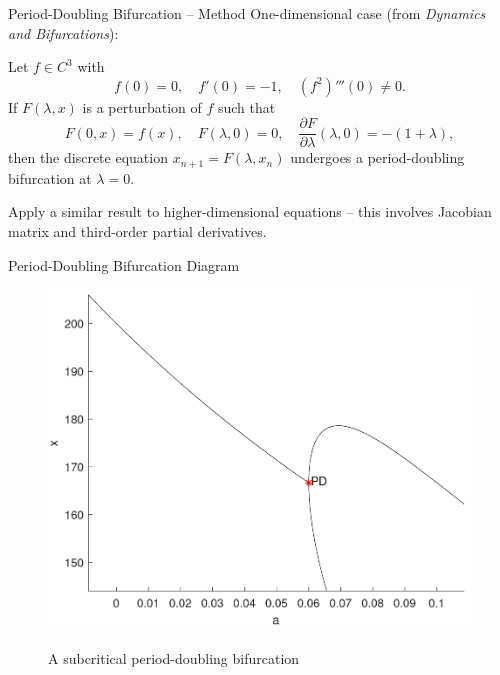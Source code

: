 \documentclass[]{beamer}
\begin{document}
	\begin{frame}{Period-Doubling Bifurcation -- Method}
		One-dimensional case (from \textit{Dynamics and Bifurcations}):
		
		\begin{block}{}
			Let $f \in C^3$ with
			\begin{equation*}
				f(0) = 0, \quad f'(0) = -1, \quad (f^2)'''(0) \ne 0.
			\end{equation*}
			If $F(\lambda, x)$ is a perturbation of $f$ such that
			\begin{equation*}
				F(0,x) = f(x), \quad F(\lambda,0)= 0, \quad \frac{\partial F}{\partial \lambda}(\lambda, 0) = -(1+\lambda),
			\end{equation*}
			then the discrete equation $x_{n+1} = F(\lambda, x_n)$ undergoes a period-doubling bifurcation at $\lambda = 0$.
		\end{block}
		\vfill
		
		Apply a similar result to higher-dimensional equations -- this involves Jacobian matrix and third-order partial derivatives.
	\end{frame}
	
	\begin{frame}{Period-Doubling Bifurcation Diagram}
		\begin{figure}
			\centering
			\includegraphics[width=.8\textwidth]{pd.png}
			
			A subcritical period-doubling bifurcation
		\end{figure}
	\end{frame}
	
\end{document}
